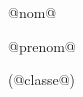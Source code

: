 \begin{block}
\begin{minipage}{0.5\linewidth}
\bigskip

\begin{center}
@nom@

@prenom@

(@classe@)
\end{center}
\end{minipage}



\end{block}

\vfill


\vfill
